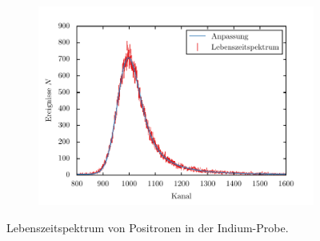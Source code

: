 \documentclass[11pt, a4paper]{article}
\numberwithin{equation}{section}
\begin{document}
\begin{appendix}
\begin{figure}
	\begin{subfigure}{\textwidth}
		\centering
		\includegraphics{./figures/lifetimes/120_grad.pdf}
	\end{subfigure}
	\caption{Lebenszeitspektrum von Positronen in der Indium-Probe.}
\end{figure}








\end{appendix}
\end{document}
